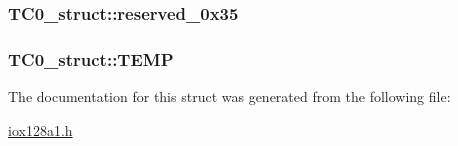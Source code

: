 \label{struct_t_c0__struct_a1c3d787dbae4df75e8045176cdd47883}
\hypertarget{struct_t_c0__struct_a824f43a93d5d00b8554121c2f6c2f0cf}{
\subsubsection[{reserved\_\-0x35}]{ {\bf TC0\_\-struct::reserved\_\-0x35}}}
\label{struct_t_c0__struct_a824f43a93d5d00b8554121c2f6c2f0cf}
\hypertarget{struct_t_c0__struct_a5ff89104a4067070cc1953ab8ba13f8d}{
\subsubsection[{TEMP}]{ {\bf TC0\_\-struct::TEMP}}}
\label{struct_t_c0__struct_a5ff89104a4067070cc1953ab8ba13f8d}


The documentation for this struct was generated from the following file:\begin{DoxyCompactItemize}
\item 
\hyperlink{iox128a1_8h}{iox128a1.h}\end{DoxyCompactItemize}
